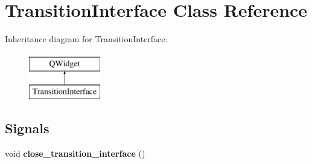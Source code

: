 \hypertarget{class_transition_interface}{}\section{Transition\+Interface Class Reference}
\label{class_transition_interface}
Inheritance diagram for Transition\+Interface\+:\begin{figure}[H]
\begin{center}
\leavevmode
\includegraphics[height=2.000000cm]{class_transition_interface}
\end{center}
\end{figure}
\subsection*{Signals}
\begin{DoxyCompactItemize}
\item 
\mbox{\label{class_transition_interface_a962b7ba06f4cff39885ba1c744a86a2d}} 
void {\bfseries close\+\_\+transition\+\_\+interface} ()
\end{DoxyCompactItemize}
